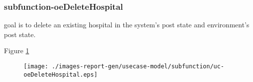 \subsubsection{subfunction-oeDeleteHospital}

\label{RE-use-case-oeDeleteHospital}


goal is to delete an existing hospital in the system's post state and environment's post state.		  


\begin{usecase}
  





\addnumberedsinglerow{}{
}

\addnumberedsinglerow{}{
}

\addnumberedsinglerow{}{
}


\end{usecase} 

Figure \ref{fig:lu.uni.lassy.excalibur.examples.icrash-RE-UCD-uc-oeDeleteHospital}

\begin{figure}[htbp]
\begin{center}

\texttt{[image: ./images-report-gen/usecase-model/subfunction/uc-oeDeleteHospital.eps]}
\end{center}
\caption[lu.uni.lassy.excalibur.examples.icrash Use Case Diagram: uc-oeDeleteHospital]{}
\label{fig:lu.uni.lassy.excalibur.examples.icrash-RE-UCD-uc-oeDeleteHospital}
\end{figure}
\vspace{0.5cm}
